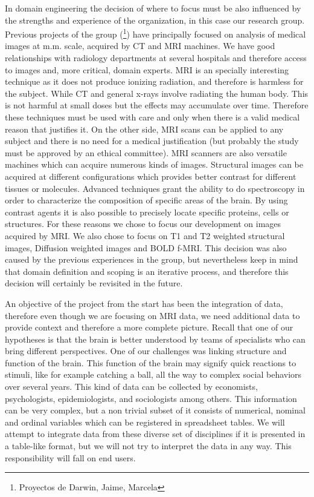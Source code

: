 In domain engineering the decision of where to focus must be also influenced by the strengths and experience of the organization, in this case our research group. Previous projects of the group (\footnote{Proyectos de Darwin, Jaime, Marcela}) have principally focused on analysis of medical images at m.m. scale, acquired by CT and MRI machines. We have good relationships with radiology departments at several hospitals and therefore access to images and, more critical, domain experts. MRI is an specially interesting technique as it does not produce ionizing radiation, and therefore is harmless for the subject. While CT and general x-rays involve radiating the human body. This is not harmful at small doses but the effects may accumulate over time. Therefore these techniques must be used with care and only when there is a valid medical reason that justifies it. On the other side, MRI scans can be applied to any subject and there is no need for a medical justification (but probably the study must be approved by an ethical committee). MRI scanners are also versatile machines which can acquire numerous kinds of images. Structural images can be acquired at different configurations which provides better contrast for different tissues or molecules. Advanced techniques grant the ability to do spectroscopy in order to characterize the composition of specific areas of the brain. By using contrast agents it is also possible to precisely locate specific proteins, cells or structures. 
For these reasons we chose to focus our development on images acquired by MRI. We also chose to focus on T1 and T2 weighted structural images, Diffusion weighted images and BOLD f-MRI. This decision was also caused by the previous experiences in the group, but nevertheless keep in mind that domain definition and scoping is an iterative process, and therefore this decision will certainly be revisited in the future.

An objective of the project from the start has been the integration of data, therefore even though we are focusing on MRI data, we need additional data to provide context and therefore a more complete picture. Recall that one of our hypotheses is that the brain is better understood by teams of specialists who can bring different perspectives. One of our challenges was linking structure and function of the brain. This function of the brain may signify quick reactions to stimuli, like for example catching a ball, all the way to complex social behaviors over several years. This kind of data can be collected by economists, psychologists, epidemiologists, and sociologists among others. This information can be very complex, but a non trivial subset of it consists of numerical, nominal and ordinal variables which can be registered in spreadsheet tables. We will attempt to integrate data from these diverse set of disciplines if it is presented in a table-like format, but we will not try to interpret the data in any way. This responsibility will fall on end users. 

